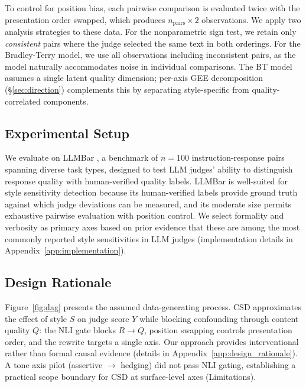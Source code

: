 To control for position bias, each pairwise comparison is evaluated twice with the presentation order swapped, which produces $n_{\text{pairs}} \times 2$ observations.
We apply two analysis strategies to these data.
For the nonparametric sign test, we retain only \emph{consistent} pairs where the judge selected the same text in both orderings.
For the Bradley-Terry model, we use all observations including inconsistent pairs, as the model naturally accommodates noise in individual comparisons.
The BT model assumes a single latent quality dimension; per-axis GEE decomposition (\S\ref{sec:direction}) complements this by separating style-specific from quality-correlated components.

\subsection{Experimental Setup}
\label{sec:setup}

We evaluate on LLMBar \citep{zeng2023llmbar}, a benchmark of $n = 100$ instruction-response pairs spanning diverse task types, designed to test LLM judges' ability to distinguish response quality with human-verified quality labels.
LLMBar is well-suited for style sensitivity detection because its human-verified labels provide ground truth against which judge deviations can be measured, and its moderate size permits exhaustive pairwise evaluation with position control.
We select formality and verbosity as primary axes based on prior evidence that these are among the most commonly reported style sensitivities in LLM judges \citep{wu2023style,saito2023verbosity} (implementation details in Appendix~\ref{app:implementation}).

\subsection{Design Rationale}
\label{sec:causal_framework}

Figure~\ref{fig:dag} presents the assumed data-generating process.
CSD approximates the effect of style $S$ on judge score $Y$ while blocking confounding through content quality $Q$: the NLI gate blocks $R \to Q$, position swapping controls presentation order, and the rewrite targets a single axis.
Our approach provides interventional rather than formal causal evidence (details in Appendix~\ref{app:design_rationale}).
A tone axis pilot (assertive $\to$ hedging) did not pass NLI gating, establishing a practical scope boundary for CSD at surface-level axes (Limitations).
